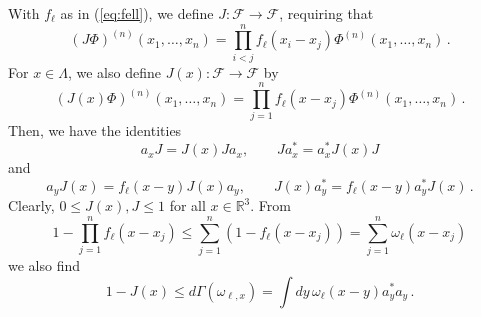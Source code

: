 \documentclass[a4paper,11pt]{article}
\def\bR{\mathbb{R}}
\def\cF{\mathcal{F}}
\numberwithin{equation}{section}
\begin{document}
With $f_\ell$ as in (\ref{eq:fell}), we define $J : \cF \to \cF$, requiring that  
\begin{equation}\label{eq:defJ} (J \Phi)^{(n)} (x_1, \dots , x_n) = \prod_{i<j}^n f_\ell (x_i - x_j) \Phi^{(n)} (x_1, \dots , x_n) \,. \end{equation}
For $x \in \Lambda$, we also define $J(x) : \cF \to \cF$ by 
\[ (J(x) \Phi)^{(n)} (x_1, \dots , x_n) = \prod_{j=1}^n f_\ell (x - x_j) \Phi^{(n)} (x_1, \dots , x_n) \,.\]
Then, we have the identities 
\[ a_x J = J(x) J a_x , \qquad J a_x^* = a_x^* J(x) J \]
and
\[ a_y J(x) = f_\ell (x-y) J(x) a_y, \qquad J(x) a_y^* = f_\ell (x-y) a_y^* J(x) \,.\]
Clearly, $0 \leq J(x), J \leq 1$ for all $x \in \bR^3$. From
\[ 1 - \prod_{j=1}^n f_\ell (x- x_j) \leq \sum_{j=1}^n (1 - f_\ell (x-x_j)) = \sum_{j=1}^n \omega_\ell (x-x_j) \]
we also find 
\begin{equation}\label{eq:1-J} 1 - J(x) \leq d\Gamma (\omega_{\ell,x}) = \int dy \, \omega_\ell (x-y) a_y^* a_y \,. \end{equation}
\end{document}
